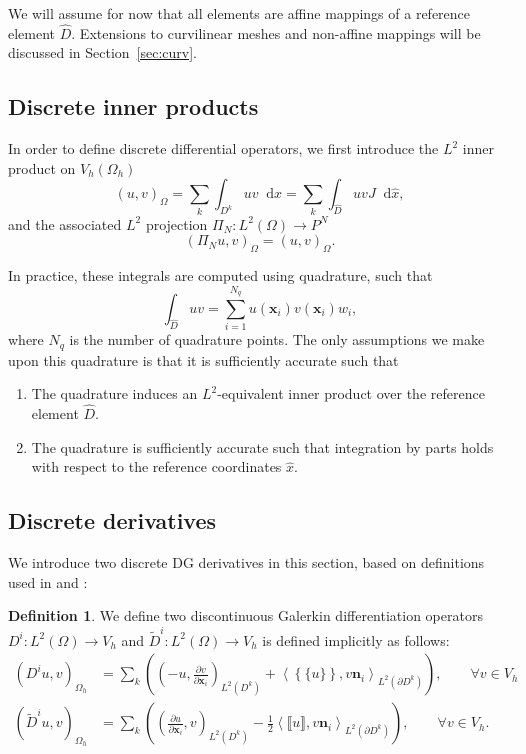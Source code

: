 \documentclass[preprint,10pt]{article}
\theoremstyle{definition}
\newtheorem{definition}{Definition}
\theoremstyle{lemma}
\newcommand{\pd}[2]{\frac{\partial#1}{\partial#2}}
\newcommand{\LRp}[1]{\left( #1 \right)}
\newcommand{\LRa}[1]{\left\langle #1 \right\rangle}
\newcommand{\LRc}[1]{\left\{ #1 \right\}}
\newcommand{\jump}[1] {\ensuremath{\llbracket#1\rrbracket}}
\newcommand{\avg}[1] {\ensuremath{\LRc{\!\{#1\}\!}}}
\newcommand{\Oh}{{\Omega_h}}
\newcommand{\LK}{L^2\LRp{D^k}}
\newcommand{\LdK}{L^2\LRp{\partial D^k}}
\newcommand*\diff[1]{\mathop{}\!{\mathrm{d}#1}}
\begin{document}
We will assume for now that all elements are affine mappings of a reference element $\widehat{D}$.  Extensions to curvilinear meshes and non-affine mappings will be discussed in Section~\ref{sec:curv}.  

\subsection{Discrete inner products}

In order to define discrete differential operators, we first introduce the $L^2$ inner product on $V_h\LRp{\Oh}$
\[
\LRp{u,v}_{\Omega} = \sum_{k} \int_{D^k} uv \diff{x} = \sum_{k} \int_{\widehat{D}} uv J \diff{\widehat{x}},
\]
and the associated $L^2$ projection $\Pi_N: L^2\LRp{\Omega}\rightarrow P^N$
\[
\LRp{\Pi_N u,v}_{\Omega} = \LRp{u,v}_{\Omega}.  
\]

In practice, these integrals are computed using quadrature, such that 
\begin{equation}
\int_{\widehat{D}}uv = \sum_{i=1}^{N_q} u(\bm{x}_i)v(\bm{x}_i) w_i,
\label{eq:quad}
\end{equation}
where $N_q$ is the number of quadrature points.  The only assumptions we make upon this quadrature is that it is sufficiently accurate such that 
\begin{enumerate}
\item The quadrature induces an $L^2$-equivalent inner product over the reference element $\widehat{D}$.
\item The quadrature is sufficiently accurate such that integration by parts holds with respect to the reference coordinates $\widehat{x}$.
\end{enumerate}


\subsection{Discrete derivatives}
We introduce two discrete DG derivatives in this section, based on definitions used in \cite{di2011mathematical} and \cite{hesthaven2004high,Warburton20063205}:
\begin{definition}
We define two discontinuous Galerkin differentiation operators ${D}^i: L^2\LRp{\Omega}\rightarrow V_h$ and $\tilde{D}^i: L^2\LRp{\Omega}\rightarrow V_h$ is defined implicitly as follows:
\begin{align}
\LRp{{D}^i u,v}_{\Oh} &= \sum_{k} \LRp{\LRp{-u,\pd{v}{\bm{x}_i}}_{\LK} + \LRa{\avg{u},v\bm{n}_i}_{\LdK}}, \qquad \forall v \in V_h\\
\LRp{\tilde{D}^i u,v}_{\Oh} &= \sum_{k} \LRp{\LRp{\pd{u}{\bm{x}_i},v}_{\LK} - \frac{1}{2}\LRa{\jump{u},v\bm{n}_i}_{\LdK}}, \qquad \forall v\in V_h.
\label{eq:dgd1}
\end{align}
\end{definition}
\end{document}
